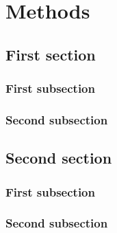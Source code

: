 \chapter{Methods}\label{chapter:methods}
\thispagestyle{chapterBeginStyle}

\section{First section}
\subsection{First subsection}
\subsection{Second subsection}

\section{Second section}
\subsection{First subsection}
\subsection{Second subsection}